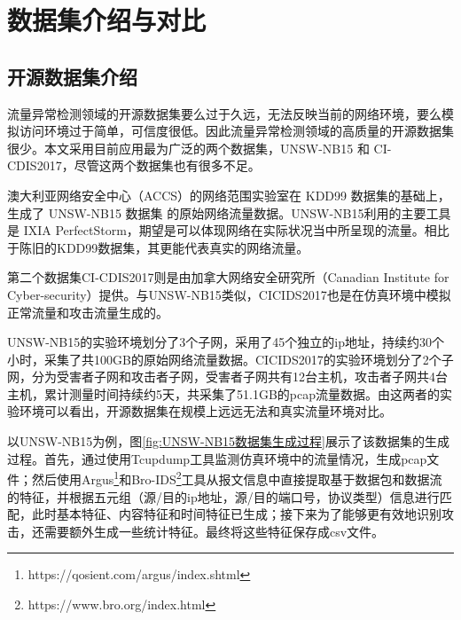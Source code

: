 
\chapter{数据集介绍与对比}
\section{开源数据集介绍}
流量异常检测领域的开源数据集要么过于久远，无法反映当前的网络环境，要么模拟访问环境过于简单，可信度很低。因此流量异常检测领域的高质量的开源数据集很少。本文采用目前应用最为广泛的两个数据集，UNSW-NB15 和 CI-
CDIS2017，尽管这两个数据集也有很多不足。

澳大利亚网络安全中心（ACCS）的网络范围实验室在 KDD99 数据集的基础上，生成了 UNSW-NB15 数据集\cite{moustafa2015unsw} 的原始网络流量数据。UNSW-NB15利用的主要工具是 IXIA PerfectStorm，期望是可以体现网络在实际状况当中所呈现的流量。相比于陈旧的KDD99数据集\cite{ozgur2016review}，其更能代表真实的网络流量。

第二个数据集CI-CDIS2017则是由加拿大网络安全研究所（Canadian Institute for Cyber-security）提供。与UNSW-NB15类似，CICIDS2017也是在仿真环境中模拟正常流量和攻击流量生成的。

UNSW-NB15的实验环境划分了3个子网，采用了45个独立的ip地址，持续约30个小时，采集了共100GB的原始网络流量数据。CICIDS2017的实验环境划分了2个子网，分为受害者子网和攻击者子网，受害者子网共有12台主机，攻击者子网共4台主机，累计测量时间持续约5天，共采集了51.1GB的pcap流量数据。由这两者的实验环境可以看出，开源数据集在规模上远远无法和真实流量环境对比。




以UNSW-NB15为例，图\ref{fig:UNSW-NB15数据集生成过程}展示了该数据集的生成过程。首先，通过使用Tcupdump工具监测仿真环境中的流量情况，生成pcap文件；然后使用Argus\footnote{https://qosient.com/argus/index.shtml}和Bro-IDS\footnote{https://www.bro.org/index.html}工具从报文信息中直接提取基于数据包和数据流的特征，并根据五元组（源/目的ip地址，源/目的端口号，协议类型）信息进行匹配，此时基本特征、内容特征和时间特征已生成；接下来为了能够更有效地识别攻击，还需要额外生成一些统计特征。最终将这些特征保存成csv文件。



